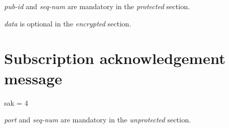 {\itshape pub-\/id} and {\itshape seq-\/num} are mandatory in the {\itshape protected} section.

{\itshape data} is optional in the {\itshape encrypted} section.\hypertarget{message-types-and-flow_subscription-acknowledgement-message}{}\section{Subscription acknowledgement message}\label{message-types-and-flow_subscription-acknowledgement-message}
\begin{DoxyVerb}sak = 4
\end{DoxyVerb}


{\itshape port} and {\itshape seq-\/num} are mandatory in the {\itshape unprotected} section. 